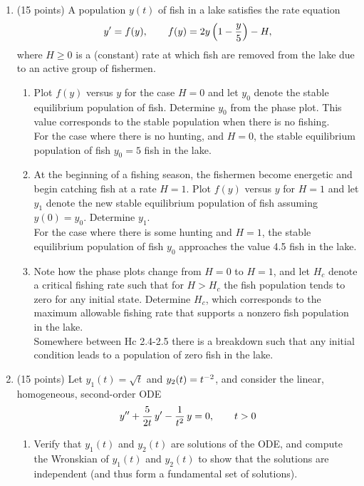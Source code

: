 \documentclass{article}
\begin{document}
\begin{enumerate}

\item (15 points) A population $y(t)$ of fish in a lake satisfies the rate equation
\[
y'=f(y),\qquad f(y)=2y\left(1-{y\over5}\right)-H,
\]
where $H\ge0$ is a (constant) rate at which fish are removed from the lake due to an active group of fishermen.
\begin{enumerate}
\item
Plot $f(y)$ versus $y$ for the case $H=0$ and let $y_0$ denote the stable equilibrium population of fish.  Determine $y_0$ from the phase plot.  This value corresponds to the stable population when there is no fishing.\\

For the case where there is no hunting, and $H=0$, the stable equilibrium population of fish $y_0 = 5$ fish in the lake.\\

\item
At the beginning of a fishing season, the fishermen become energetic and begin catching fish at a rate $H=1$.  Plot $f(y)$ versus $y$ for $H=1$ and let $y_1$ denote the new stable equilibrium population of fish assuming $y(0)=y_0$.  Determine $y_1$.\\

For the case where there is some hunting and $H=1$, the stable equilibrium population of fish $y_0$ approaches the value 4.5 fish in the lake.\\

\item
Note how the phase plots change from $H=0$ to $H=1$, and let $H_c$ denote a critical fishing rate such that for $H>H_c$ the fish population tends to zero for any initial state.  Determine $H_c$, which corresponds to the maximum allowable fishing rate that supports a nonzero fish population in the lake.\\

Somewhere between Hc 2.4-2.5 there is a breakdown such that any initial condition leads to a population of zero fish in the lake.

\end{enumerate}

\newpage
\item (15 points) Let $y_1(t)=\sqrt{t}$ and $y_2(t)=t\sp{-2}$, and consider the linear, homogeneous, second-order ODE
\[
y\sp{\prime\prime}+{5\over2t}\,y\sp\prime-{1\over t\sp2}\,y=0,\qquad t>0
\]
\begin{enumerate}
\item
Verify that $y_1(t)$ and $y_2(t)$ are solutions of the ODE, and compute the Wronskian of $y_1(t)$ and $y_2(t)$ to show that the solutions are independent (and thus form a fundamental set of solutions).\\


\end{enumerate}
\end{enumerate}
\end{document}
